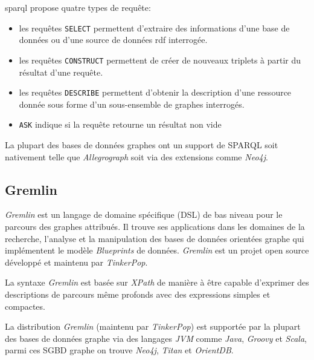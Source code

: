   \acrshort{sparql} propose quatre types de requête:\medskip

  \begin{itemize}\renewcommand\labelitemi{--}
  \item les requêtes \texttt{SELECT} permettent d'extraire des
    informations d'une base de données ou d'une source de données
    \acrshort{rdf} interrogée.

  \item les requêtes \texttt{CONSTRUCT} permettent de créer de
    nouveaux triplets à partir du résultat d'une requête.

  \item les requêtes \texttt{DESCRIBE} permettent d'obtenir la
    description d'une ressource donnée sous forme d'un
    sous-ensemble de graphes interrogés.

  \item \texttt{ASK} indique si la requête retourne un résultat non
    vide
  \end{itemize}
  \enddescription
  \medskip

  La plupart des bases de données graphes ont un support de
  \textsc{SPARQL} soit nativement telle que \emph{Allegrograph} soit
  via des extensions comme \emph{Neo4j}.

  \subsection{Gremlin}
  \label{sec:gremlin}
  \emph{Gremlin} \cite{gremlin-wiki} est un langage de domaine
  spécifique (\acrshort{DSL}) de bas niveau pour le parcours des
  graphes attribués. Il trouve ses applications dans les domaines de
  la recherche, l'analyse et la manipulation des bases de données
  orientées graphe qui implémentent le modèle \emph{Blueprints}
  \cite{blueprints} de données. \emph{Gremlin} \cite{gremlin-wiki} est
  un projet open source développé et maintenu par
  \emph{TinkerPop}.\medskip

  La syntaxe \emph{Gremlin} est basée sur \emph{XPath} de manière à
  être capable d'exprimer des descriptions de parcours même profonds
  avec des expressions simples et compactes.\medskip

  La distribution \emph{Gremlin} (maintenu par \emph{TinkerPop}) est
  supportée par la plupart des bases de données graphe via des
  langages \emph{JVM} comme \emph{Java}, \emph{Groovy} et
  \emph{Scala}, parmi ces \acrshort{SGBD} graphe on trouve
  \emph{Neo4j}, \emph{Titan} et \emph{OrientDB}.

